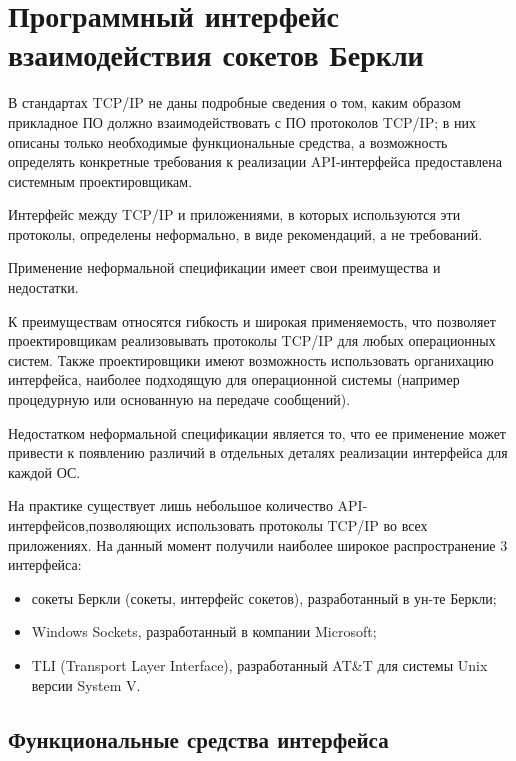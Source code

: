 \chapter{Программный интерфейс взаимодействия сокетов Беркли}

В стандартах TCP/IP не даны подробные сведения о том,  каким образом прикладное ПО должно взаимодействовать с ПО протоколов TCP/IP; в них описаны только необходимые функциональные средства,  а возможность определять конкретные требования к реализации API-интерфейса предоставлена системным проектировщикам.

Интерфейс между TCP/IP и приложениями,  в которых используются эти протоколы,  определены неформально,  в виде рекомендаций,  а не требований.

Применение неформальной спецификации имеет свои преимущества и недостатки.

К преимуществам относятся гибкость и широкая применяемость,  что позволяет проектировщикам реализовывать протоколы TCP/IP для любых операционных систем. Также проектировщики имеют возможность использовать органихацию интерфейса,  наиболее подходящую для операционной системы (например процедурную или основанную на передаче сообщений).

Недостатком неформальной спецификации является то,  что ее применение может привести к появлению различий в отдельных деталях реализации интерфейса для каждой ОС. 

На практике существует лишь небольшое количество API-интерфейсов,позволяющих использовать протоколы TCP/IP во всех приложениях. На данный момент получили наиболее широкое распространение 3 интерфейса: 
\begin{itemize}
\item сокеты Беркли (сокеты,  интерфейс сокетов),  разработанный в ун-те Беркли; 
\item Windows Sockets, разработанный в компании Microsoft;
\item TLI (Transport Layer Interface), разработанный AT\&T для системы Unix версии System V.
\end{itemize}

\section{Функциональные средства интерфейса}

